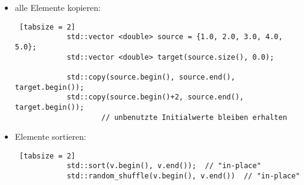 \documentclass{article}
\begin{document}
\begin{itemize}
\begin{lstlisting} [tabsize = 2]
	 		im Header <algorithm>
	 	\end{lstlisting}
	 	\item alle Elemente kopieren:
	 	\begin{lstlisting} [tabsize = 2]
	 		std::vector <double> source = {1.0, 2.0, 3.0, 4.0, 5.0};
	 		std::vector <double> target(source.size(), 0.0);
	 		
	 		std::copy(source.begin(), source.end(), target.begin());
	 		std::copy(source.begin()+2, source.end(), target.begin());  
			 		// unbenutzte Initialwerte bleiben erhalten
	 	\end{lstlisting}
	 	\item Elemente sortieren:
	 	\begin{lstlisting} [tabsize = 2]
	 		std::sort(v.begin(), v.end());  // "in-place"
	 		std::random_shuffle(v.begin(), v.end())  // "in-place"
	 	\end{lstlisting}
	 \end{itemize}
	 	
	
\end{document}
